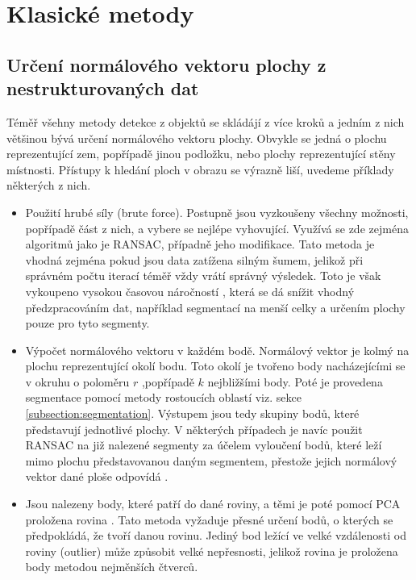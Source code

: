 \documentclass[twoside]{ctuthesis}
\begin{document}
\section{Klasické metody}

\subsection{Určení normálového vektoru plochy z nestrukturovaných dat}
\label{sec:normal_methods}
Téměř všehny metody detekce z objektů se skládájí z více kroků a jedním z nich většinou bývá určení normálového vektoru plochy. Obvykle se jedná o plochu reprezentující zem, popřípadě jinou podložku, nebo plochy reprezentující stěny místnosti. Přístupy k hledání ploch v obrazu se výrazně liší, uvedeme příklady některých z nich.

\begin{itemize} 
    \item Použití hrubé síly (brute force). Postupně jsou vyzkoušeny všechny možnosti, popřípadě část z nich, a vybere se nejlépe vyhovující. Využívá se zde zejména algoritmů jako je RANSAC, případně jeho modifikace. Tato metoda je vhodná zejména pokud jsou data zatížena silným šumem, jelikož při správném počtu iterací téměř vždy vrátí správný výsledek. Toto je však vykoupeno vysokou časovou náročností \cite{RANSAC_plane,single_RGBD_reconstruction}, která se dá snížit vhodný předzpracováním dat, například segmentací na menší celky a určením plochy pouze pro tyto segmenty. \cite{rusu2009close}
    \item Výpočet normálového vektoru v každém bodě. Normálový vektor je kolmý na plochu reprezentující okolí bodu. Toto okolí je tvořeno body nacházejícími se v okruhu o poloměru $r$ \cite{wang2015dominant} ,popřípadě $k$ nejbližšími body\cite{holz2011real,trevor2013efficient}. Poté je provedena segmentace pomocí metody rostoucích oblastí viz. sekce \ref{subsection:segmentation}. Výstupem jsou tedy skupiny bodů, které představují jednotlivé plochy. V některých případech je navíc použit RANSAC na již nalezené segmenty za účelem vyloučení bodů, které leží mimo plochu představovanou daným segmentem, přestože jejich normálový vektor dané ploše odpovídá \cite{lai2011large}.
    \item Jsou nalezeny body, které patří do dané roviny, a těmi je poté pomocí PCA proložena rovina \cite{zhang2016fast}. Tato metoda vyžaduje přesné určení bodů, o kterých se předpokládá, že tvoří danou rovinu. Jediný bod ležící ve velké vzdálenosti od roviny (outlier) může způsobit velké nepřesnosti, jelikož rovina je proložena body metodou nejměnších čtverců.
\end{itemize}
\end{document}
